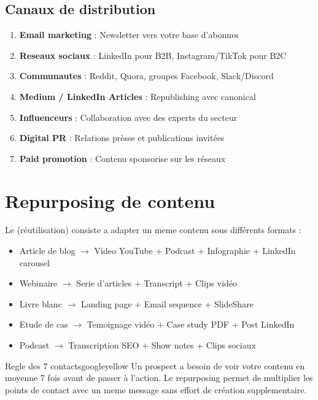 \subsection{Canaux de distribution}

\begin{enumerate}
    \item \textbf{Email marketing} : Newsletter vers votre base d'abonnes
    \item \textbf{Reseaux sociaux} : LinkedIn pour B2B, Instagram/TikTok pour B2C
    \item \textbf{Communautes} : Reddit, Quora, groupes Facebook, Slack/Discord
    \item \textbf{Medium / LinkedIn Articles} : Republishing avec canonical
    \item \textbf{Influenceurs} : Collaboration avec des experts du secteur
    \item \textbf{Digital PR} : Relations prèsse et publications invitées
    \item \textbf{Paid promotion} : Contenu sponsorise sur les réseaux
\end{enumerate}

\section{Repurposing de contenu}

Le  (réutilisation) consiste a adapter un meme contenu sous différents formats :

\begin{itemize}
    \item Article de blog $\rightarrow$ Video YouTube + Podcast + Infographie + LinkedIn carousel
    \item Webinaire $\rightarrow$ Serie d'articles + Transcript + Clips vidéo
    \item Livre blanc $\rightarrow$ Landing page + Email sequence + SlideShare
    \item Etude de cas $\rightarrow$ Temoignage vidéo + Case study PDF + Post LinkedIn
    \item Podcast $\rightarrow$ Transcription SEO + Show notes + Clips sociaux
\end{itemize}

\begin{mybox}{Regle des 7 contacts}{googleyellow}
Un prospect a besoin de voir votre contenu en moyenne 7 fois avant de passer à l'action. Le repurposing permet de multiplier les points de contact avec un meme message sans effort de création supplementaire.
\end{mybox}

